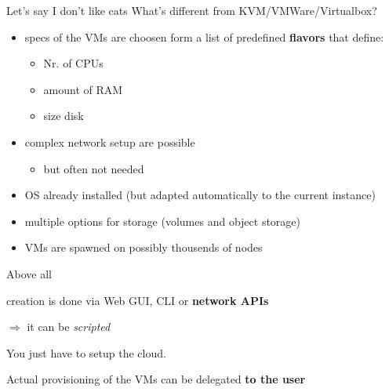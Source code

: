 \documentclass[english,serif,mathserif,usenames,dvipsnames]{beamer}
\begin{document}
\begin{frame}[fragile]
\begin{columns}
  \end{columns}

\end{frame}

\begin{frame}
  {Let's say I don't like cats}
  What's different from KVM/VMWare/Virtualbox?

  \begin{itemize}
  \item specs of the VMs are choosen form a list of predefined
    \textbf{flavors} that define:
    \begin{itemize}
    \item Nr. of CPUs
    \item amount of RAM
    \item size disk
    \end{itemize}

  \item complex network setup are possible
    \begin{itemize}
    \item but often not needed
    \end{itemize}

  \item OS already installed (but adapted automatically to the current
    instance)

  \item multiple options for storage (volumes and object storage)

  \item VMs are spawned on possibly thousends of nodes

  \end{itemize}
\end{frame}

\begin{frame}
  {Above all}

  creation is done via Web GUI, CLI or \textbf{network APIs}

  $\Rightarrow$ it can be \textit{scripted}

  \+
  \pause
  You just have to setup the cloud.

  \+
  Actual provisioning of the VMs can be delegated \textbf{to
    the user}


\end{frame}
\end{document}
